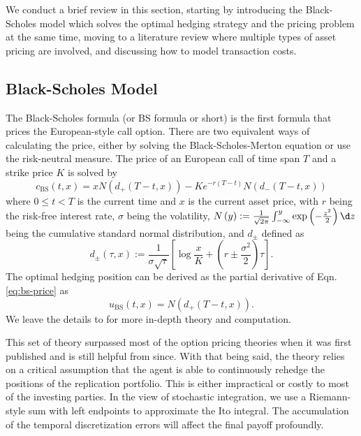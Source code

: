 We conduct a brief review in this section, starting by introducing
the Black-Scholes model which solves the optimal hedging strategy
and the pricing problem at the same time, moving to a literature review
where multiple types of asset pricing are involved, and discussing
how to model transaction costs.

\subsection{Black-Scholes Model}

The Black-Scholes formula (or BS formula or short) is the first formula
that prices the European-style call option. There are two equivalent
ways of calculating the price, either by solving the Black-Scholes-Merton
equation or use the risk-neutral measure. The price of an European
call of time span $T$ and a strike price $K$ is solved by 
\begin{equation}
c_{\text{BS}}\left(t,x\right)=xN\left(d_{+}\left(T-t,x\right)\right)-Ke^{-r\left(T-t\right)}N\left(d_{-}\left(T-t,x\right)\right)\label{eq:bs-price}
\end{equation}
where $0\le t<T$ is the current time and $x$ is the current asset
price, with $r$ being the risk-free interest rate, $\sigma$ being
the volatility, $N\left(y\right):=\frac{1}{\sqrt{2\pi}}\int_{-\infty}^{y}\exp\left(-\frac{z^{2}}{2}\right)\d z$
being the cumulative standard normal distribution, and $d_{\pm}$
defined as
\[
d_{\pm}\left(\tau,x\right):=\frac{1}{\sigma\sqrt{\tau}}\left[\log\frac{x}{K}+\left(r\pm\frac{\sigma^{2}}{2}\right)\tau\right].
\]
The optimal hedging position can be derived as the partial derivative
of Eqn. \ref{eq:bs-price} as 
\begin{equation}
u_{\text{BS}}\left(t,x\right)=N\left(d_{+}\left(T-t,x\right)\right).\label{eq:bs-hedge}
\end{equation}
We leave the details to \cite{shreve2004stochastic,alma991057973644906011}
for more in-depth theory and computation. 

This set of theory surpassed most of the option pricing theories when
it was first published and is still helpful from since. With that
being said, the theory relies on a critical assumption that the agent
is able to continuously rehedge the positions of the replication portfolio.
This is either impractical or costly to most of the investing parties.
In the view of stochastic integration, we use a Riemann-style sum
with left endpoints to approximate the Ito integral. The accumulation
of the temporal discretization errors will affect the final payoff
profoundly.

